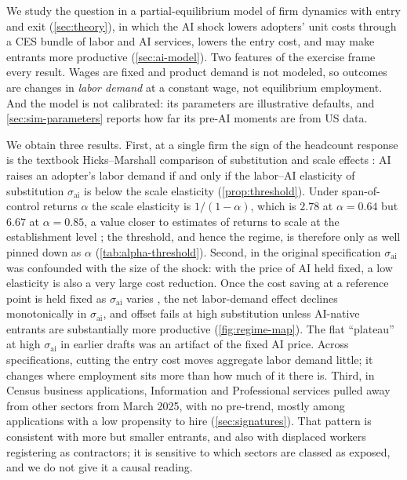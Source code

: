We study the question in a partial-equilibrium model of firm dynamics with entry and exit (\cref{sec:theory}), in which the AI shock lowers adopters' unit costs through a CES bundle of labor and AI services, lowers the entry cost, and may make entrants more productive (\cref{sec:ai-model}).
Two features of the exercise frame every result.
Wages are fixed and product demand is not modeled, so outcomes are changes in \emph{labor demand} at a constant wage, not equilibrium employment.
And the model is not calibrated: its parameters are illustrative defaults, and \cref{sec:sim-parameters} reports how far its pre-AI moments are from US data.

We obtain three results.
First, at a single firm the sign of the headcount response is the textbook Hicks--Marshall comparison of substitution and scale effects \citep{hamermesh1993labor}: AI raises an adopter's labor demand if and only if the labor--AI elasticity of substitution $\sigma_{\text{ai}}$ is below the scale elasticity (\cref{prop:threshold}).
Under span-of-control returns $\alpha$ the scale elasticity is $1/(1-\alpha)$, which is $2.78$ at $\alpha = 0.64$ but $6.67$ at $\alpha = 0.85$, a value closer to estimates of returns to scale at the establishment level \citep{atkeson2005modeling,restuccia2008policy}; the threshold, and hence the regime, is therefore only as well pinned down as $\alpha$ (\cref{tab:alpha-threshold}).
Second, in the original specification $\sigma_{\text{ai}}$ was confounded with the size of the shock: with the price of AI held fixed, a low elasticity is also a very large cost reduction.
Once the cost saving at a reference point is held fixed as $\sigma_{\text{ai}}$ varies \citep{klump2000growth,leonledesma2010identifying}, the net labor-demand effect declines monotonically in $\sigma_{\text{ai}}$, and offset fails at high substitution unless AI-native entrants are substantially more productive (\cref{fig:regime-map}).
The flat ``plateau'' at high $\sigma_{\text{ai}}$ in earlier drafts was an artifact of the fixed AI price.
Across specifications, cutting the entry cost moves aggregate labor demand little; it changes where employment sits more than how much of it there is.
Third, in Census business applications, Information and Professional services pulled away from other sectors from March 2025, with no pre-trend, mostly among applications with a low propensity to hire (\cref{sec:signatures}).
That pattern is consistent with more but smaller entrants, and also with displaced workers registering as contractors; it is sensitive to which sectors are classed as exposed, and we do not give it a causal reading.


